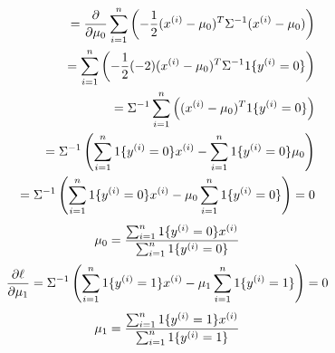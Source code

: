 \begin{answer}
\begin{eqnarray*}
=\frac{\partial}{\partial\mu_{0}}\sum_{i=1}^{n} \left(-\frac{1}{2}(x^{(i)}-\mu_{0})^T \Sigma^{-1} (x^{(i)}-\mu_{0})\right) \\
=\sum_{i=1}^{n} \left(-\frac{1}{2}(-2)(x^{(i)}-\mu_{0})^T \Sigma^{-1}1\{y^{(i)} = 0\}\right) \\
=\Sigma^{-1}\sum_{i=1}^{n} \left((x^{(i)}-\mu_{0})^T 1\{y^{(i)} = 0\}\right) \\
=\Sigma^{-1}\left(\sum_{i=1}^{n}  1\{y^{(i)} = 0\}x^{(i)}-\sum_{i=1}^{n} 1\{y^{(i)} = 0\}\mu_{0}\right) \\
=\Sigma^{-1}\left(\sum_{i=1}^{n} 1\{y^{(i)} = 0\}x^{(i)}-\mu_{0}\sum_{i=1}^{n} 1\{y^{(i)} = 0\}\right)=0
  \end{eqnarray*}
  \begin{eqnarray*}
\mu_0=\frac{\sum_{i=1}^{n} 1\{y^{(i)} = {0}\} x^{(i)}}{\sum_{i=1}^{n}1\{y^{(i)} = {0}\}}
  \end{eqnarray*}
  \begin{eqnarray*}
\frac{\partial\ell}{\partial\mu_{1}}=\Sigma^{-1}\left(\sum_{i=1}^{n} 1\{y^{(i)} = 1\}x^{(i)}-\mu_{1}\sum_{i=1}^{n} 1\{y^{(i)} = 1\}\right)=0
  \end{eqnarray*}
  \begin{eqnarray*}
\mu_1=\frac{\sum_{i=1}^{n} 1\{y^{(i)} = {1}\} x^{(i)}}{\sum_{i=1}^{n}1\{y^{(i)} = {1}\}}
  \end{eqnarray*}
\end{answer}
